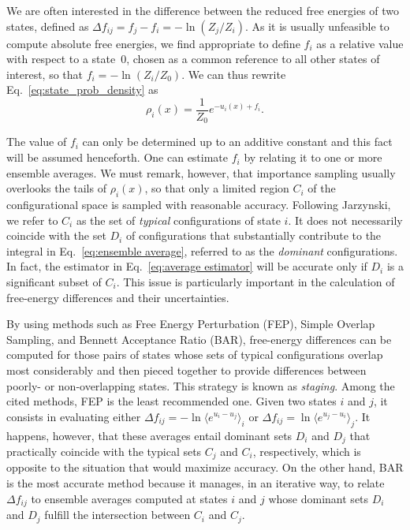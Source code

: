 \documentclass[aip,jcp,reprint,amsmath,amssymb]{revtex4-1}
\begin{document}
We are often interested in the difference between the reduced free energies of two states, defined as $\Delta f_{ij} = f_j - f_i = - \ln (Z_j/Z_i)$. As it is usually unfeasible to compute absolute free energies, we find appropriate to define $f_i$ as a relative value with respect to a state~$0$, chosen as a common reference to all other states of interest, so that $f_i = -\ln (Z_i/Z_0)$. We can thus rewrite Eq.~\eqref{eq:state_prob_density} as
\begin{equation}
\label{eq:state_prob_density_Z0}
\rho_i(x) = \frac{1}{Z_0} e^{-u_i(x)+ f_i}.
\end{equation}

The value of $f_i$ can only be determined up to an additive constant and this fact will be assumed henceforth. One can estimate $f_i$ by relating it to one or more ensemble averages. We must remark, however, that importance sampling usually overlooks the tails of $\rho_i(x)$, so that only a limited region $C_i$ of the configurational space is sampled with reasonable accuracy. Following Jarzynski,\cite{Jarzynski_2006} we refer to $C_i$ as the set of \textit{typical} configurations of state $i$. It does not necessarily coincide with the set $D_i$ of configurations that substantially contribute to the integral in Eq.~\eqref{eq:ensemble average}, referred to as the \textit{dominant} configurations. In fact, the estimator in Eq.~\eqref{eq:average estimator} will be accurate only if $D_i$ is a significant subset of $C_i$. This issue is particularly important in the calculation of free-energy differences and their uncertainties.

By using methods such as Free Energy Perturbation (FEP),\cite{Zwanzig_1954} Simple Overlap Sampling,\cite{Lee_1980, Lu_2003} and Bennett Acceptance Ratio (BAR),\cite{Bennett_1976} free-energy differences can be computed for those pairs of states whose sets of typical configurations overlap most considerably and then pieced together to provide differences between poorly- or non-overlapping states. This strategy is known as \textit{staging}.\cite{Kofke_1998} Among the cited methods, FEP is the least recommended one. Given two states $i$ and $j$, it consists in evaluating either $\Delta f_{ij} = -\ln \langle e^{u_i - u_j} \rangle_i$ or $\Delta f_{ij} = \ln \langle e^{u_j - u_i} \rangle_j$.\cite{Zwanzig_1954} It happens, however, that these averages entail dominant sets $D_i$ and $D_j$ that practically coincide with the typical sets $C_j$ and $C_i$, respectively, which is opposite to the situation that would maximize accuracy.\cite{Jarzynski_2006} On the other hand, BAR is the most accurate method because it manages, in an iterative way, to relate $\Delta f_{ij}$ to ensemble averages computed at states $i$ and $j$ whose dominant sets $D_i$ and $D_j$ fulfill the intersection between $C_i$ and $C_j$.
\end{document}
